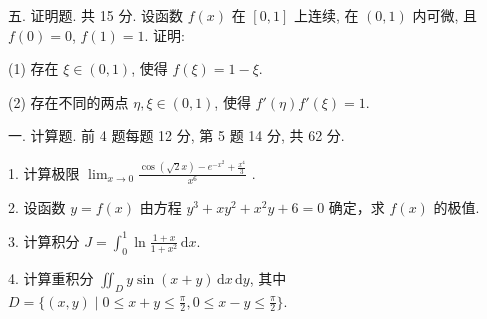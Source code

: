 \documentclass{examcollection}
\begin{document}
{\begin{minipage}{\textwidth}
五. 证明题. 共 15 分. 设函数 $f(x)$ 在 $[0,1]$ 上连续, 在 $(0,1)$ 内可微, 且 $f(0) = 0$, $f(1) = 1$. 证明:\par
(1) 存在 $\xi \in (0,1)$, 使得 $f(\xi) = 1 - \xi$.\par
(2) 存在不同的两点 $\eta, \xi \in (0,1)$, 使得 $f'(\eta)f'(\xi) = 1$.\par
{}\smallskip
一. 计算题. 前 4 题每题 12 分, 第 5 题 14 分, 共 62 分.\par
1. 计算极限  $\lim_{x\to0}\frac{\cos(\sqrt{2}x)-e^{-x^{2}}+\frac{x^{4}}{3}}{x^{6}}$ .\par
2. 设函数 $y = f(x)$ 由方程 $y^3 + xy^2 + x^2y + 6 = 0$ 确定，求 $f(x)$ 的极值.\par
3. 计算积分 $J = \int_0^1 \ln \frac{1 + x}{1 + x^2} \, \mathrm{d}x$.\par
4. 计算重积分 $\iint_{D} y \sin(x + y) \, \mathrm{d}x \, \mathrm{d}y$, 其中 $D = \{(x, y) \mid 0 \leq x + y \leq \frac{\pi}{2}, 0 \leq x - y \leq \frac{\pi}{2}\}$.\par
\end{minipage}}
\ifdim\dimexpr\ht\proofbox+\dp\proofbox\relax>\textheight
\noindent\resizebox{!}{\textheight}{\usebox{\proofbox}}\else\noindent\usebox{\proofbox}\fi\clearpage
\end{document}
